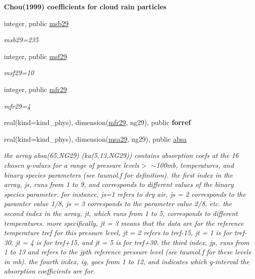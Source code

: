 \begin{Indent}\textbf{ Chou(1999) coefficients for cloud rain particles}\par
\begin{DoxyCompactItemize}
\item 
integer, public \hyperlink{group__module__radsw__kgbnn_gadd8e18a273d5fa133f22fb47c4d722da}{msb29}
\begin{DoxyCompactList}\small\item\em msb29=235 \end{DoxyCompactList}\item 
integer, public \hyperlink{group__module__radsw__kgbnn_gace849342fcb0d18d825318a2ee26ce0e}{msf29}
\begin{DoxyCompactList}\small\item\em msf29=10 \end{DoxyCompactList}\item 
integer, public \hyperlink{group__module__radsw__kgbnn_ga866ce18e53b84d75d51dd8c6a999ee7b}{mfr29}
\begin{DoxyCompactList}\small\item\em mfr29=4 \end{DoxyCompactList}\item 
real(kind=kind\+\_\+phys), dimension(\hyperlink{group__module__radsw__kgbnn_ga866ce18e53b84d75d51dd8c6a999ee7b}{mfr29}, ng29), public {\bfseries forref}
\item 
real(kind=kind\+\_\+phys), dimension(\hyperlink{namespacemodule__radsw__kgb29_adbee6e5d3b3efc437ff8815e42962b92}{msa29}, ng29), public \hyperlink{group__module__radsw__kgbnn_ga1132fd19edc0312f6bcc905619f3bdfd}{absa}
\begin{DoxyCompactList}\small\item\em the array absa(65,\+N\+G29) (ka(5,13,\+N\+G29)) contains absorption coefs at the 16 chosen g-\/values for a range of pressure levels$>$ $\sim$100mb, temperatures, and binary species parameters (see taumol.\+f for definition). the first index in the array, js, runs from 1 to 9, and corresponds to different values of the binary species parameter. for instance, js=1 refers to dry air, js = 2 corresponds to the paramter value 1/8, js = 3 corresponds to the parameter value 2/8, etc. the second index in the array, jt, which runs from 1 to 5, corresponds to different temperatures. more specifically, jt = 3 means that the data are for the reference temperature tref for this pressure level, jt = 2 refers to tref-\/15, jt = 1 is for tref-\/30, jt = 4 is for tref+15, and jt = 5 is for tref+30. the third index, jp, runs from 1 to 13 and refers to the jpth reference pressure level (see taumol.\+f for these levels in mb). the fourth index, ig, goes from 1 to 12, and indicates which g-\/interval the absorption coefficients are for. \end{DoxyCompactList}\item 

\end{DoxyCompactItemize}
\end{Indent}
